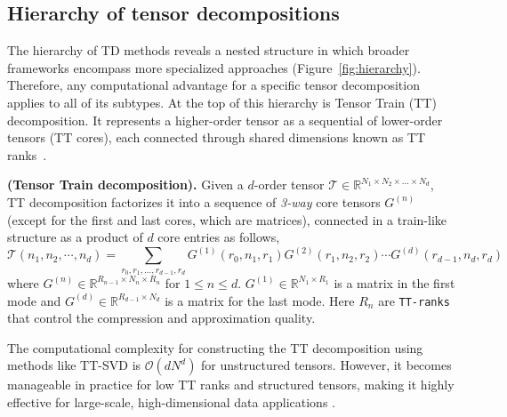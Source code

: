 \subsection{Hierarchy of tensor decompositions}
The hierarchy of TD methods \cite{kolda2009tensor} reveals a nested structure in which broader frameworks encompass more specialized approaches (Figure~\ref{fig:hierarchy}). Therefore, any computational advantage for a specific tensor decomposition applies to all of its subtypes. At the top of this hierarchy is Tensor Train (TT) decomposition. It represents a higher-order tensor as a sequential  of lower-order tensors (TT cores), each connected through shared dimensions known as TT ranks~\cite{oseledets2011tensor}. 
\begin{definition}\label{def:tt}
    \textbf{(Tensor Train decomposition).}  Given a $d$-order tensor $\mathcal{T} \in \mathbb{R}^{N_1 \times N_2 \times \dots \times N_d}$, TT decomposition factorizes it into a sequence of \textit{3-way} core tensors $G^{(n)}$ (except for the first and last cores, which are matrices), connected in a train-like structure as a product of $d$ core entries 
    as follows,
    \begin{equation}\label{eq:tt}
        \mathcal{T}(n_1, n_2, \cdots, n_d) = \sum_{r_0, r_1, \dots, r_{d-1},r_d}G^{(1)}(r_0,n_1,r_1) G^{(2)}(r_1,n_2,r_2) \cdots  G^{(d)}(r_{d-1},n_d,r_d) 
    \end{equation}
    where $G^{(n)} \in \mathbb{R}^{R_{n-1}\times N_n \times R_n}$ for $1 \leq n \leq d$. $G^{(1)} \in \mathbb{R}^{N_1 \times R_1}$ is a matrix in the first mode and $G^{(d)} \in \mathbb{R}^{R_{d-1} \times N_d}$ is a matrix for the last mode. Here $R_n$ are \texttt{TT-ranks} that control the compression and approximation quality. 
\end{definition}


The computational complexity for constructing the TT decomposition using methods like TT-SVD is $\mathcal{O}(dN^d)$ for unstructured tensors. However, it becomes manageable in practice for low TT ranks and structured tensors, making it highly effective for large-scale, high-dimensional data applications \cite{oseledets2011tensor, Zhang2020trillion}. 


